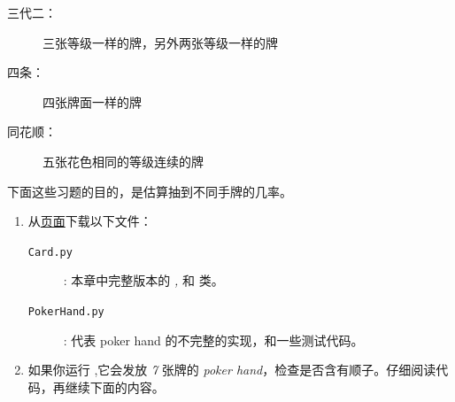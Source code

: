 \begin{exercise}
\begin{description}
\item [三代二：] 三张等级一样的牌，另外两张等级一样的牌

\item [四条：] 四张牌面一样的牌

\item [同花顺：] 五张花色相同的等级连续的牌

\end{description}


下面这些习题的目的，是估算抽到不同手牌的几率。

\begin{enumerate}


\item 从\href{http://thinkpython2.com/code}{页面}下载以下文件：

\begin{description}


\item[{\tt Card.py}]: 本章中完整版本的 {\em {} , } 和 {\em {}} 类。


\item[{\tt PokerHand.py}]: 代表 poker hand 的不完整的实现，和一些测试代码。

\end{description}


\item 如果你运行 {\em {}} ,它会发放 {\em 7} 张牌的 {\em poker hand}，检查是否含有顺子。仔细阅读代码，再继续下面的内容。



\end{enumerate}
\end{exercise}
